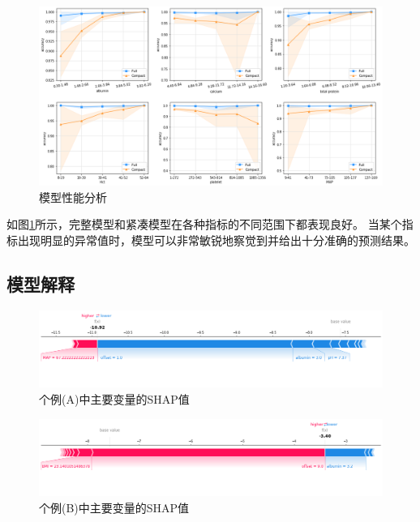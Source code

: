 \begin{figure}[htb]
    \centering
    \includegraphics[width=\linewidth]{../img/eicu_performance.png}
    \caption{模型性能分析}
    \label{figure:model-performance}
\end{figure}

如图\ref{figure:model-performance}所示，完整模型和紧凑模型在各种指标的不同范围下都表现良好。%
当某个指标出现明显的异常值时，模型可以非常敏锐地察觉到并给出十分准确的预测结果。

\subsection{模型解释}

\begin{figure}[htb]
    \centering
    \includegraphics[width=\linewidth]{../img/eicu_compact_shap_force_neg.png}
    \vspace{-4em}
    \caption{个例(A)中主要变量的SHAP值}
    \label{figure:shap-neg}
\end{figure}

\begin{figure}[htb]
    \centering
    \includegraphics[width=\linewidth]{../img/eicu_compact_shap_force_pos.png}
    \vspace{-4em}
    \caption{个例(B)中主要变量的SHAP值}
    \label{figure:shap-pos}
\end{figure}


